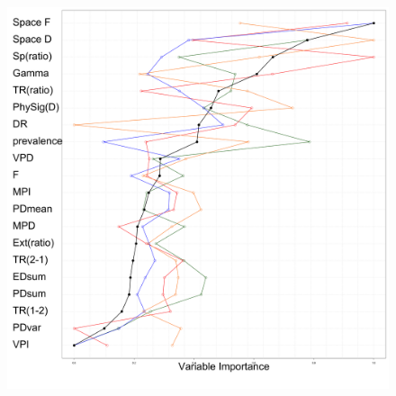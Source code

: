 \documentclass[]{book}
\theoremstyle{definition}
\theoremstyle{definition}
\theoremstyle{definition}
\theoremstyle{remark}
\begin{document}
\begin{figure}
\centering
\includegraphics{var_import_all.png}
\caption{}
\end{figure}
\end{document}
